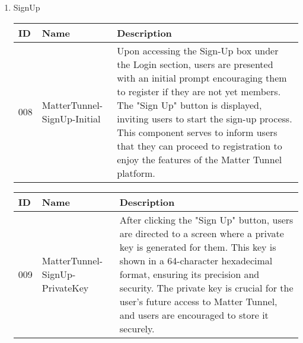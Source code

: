 \documentclass[conference]{IEEEtran}
\begin{document}
\begin{enumerate}[itemsep=2ex, parsep=1ex]
\begin{enumerate}[itemsep=2ex, parsep=1ex]
	      	      \vspace{10cm}
	      	      
	      	\item SignUp
	      	      \begin{table}[h!]
	      	      	\def\arraystretch{1.24} \small
	      	      	\begin{tabular}{|p{1.2cm}|p{2.5cm}|p{4.0cm}|}
	      	      		\hline
	      	      		ID  & Name                        & Description                                                                                                                                                                                                                                                                                                                                                                   \\
	      	      		\hline
	      	      		008 & MatterTunnel-SignUp-Initial & Upon accessing the Sign-Up box under the Login section, users are presented with an initial prompt encouraging them to register if they are not yet members. The "Sign Up" button is displayed, inviting users to start the sign-up process. This component serves to inform users that they can proceed to registration to enjoy the features of the Matter Tunnel platform. \\
	      	      		\hline
	      	      	\end{tabular}
	      	      \end{table}
	      	      
	      	      \begin{table}[h!]
	      	      	\def\arraystretch{1.24} \small
	      	      	\begin{tabular}{|p{1.2cm}|p{2.5cm}|p{4.0cm}|}
	      	      		\hline
	      	      		ID  & Name                           & Description                                                                                                                                                                                                                                                                                                                          \\
	      	      		\hline
	      	      		009 & MatterTunnel-SignUp-PrivateKey & After clicking the "Sign Up" button, users are directed to a screen where a private key is generated for them. This key is shown in a 64-character hexadecimal format, ensuring its precision and security. The private key is crucial for the user's future access to Matter Tunnel, and users are encouraged to store it securely. \\
	      	      		\hline
	      	      	\end{tabular}
	      	      \end{table}
	      	      

\end{enumerate}
\end{enumerate}
\end{document}
